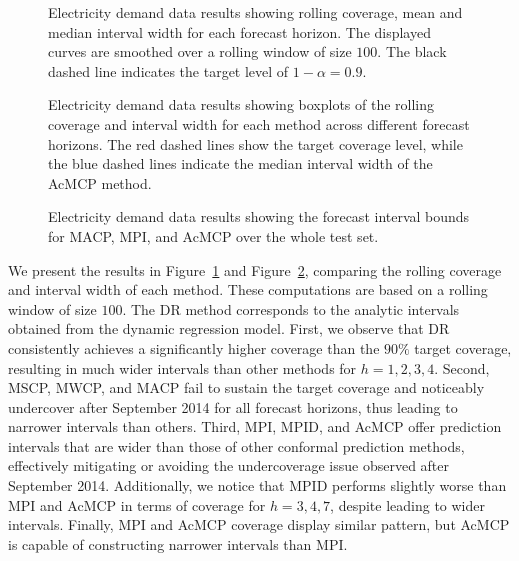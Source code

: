 \documentclass[
  11pt,
  12pt]{article}
\theoremstyle{plain}
\theoremstyle{remark}
\begin{document}
\begin{figure}


\caption{\label{fig-elec_cov}Electricity demand data results showing
rolling coverage, mean and median interval width for each forecast
horizon. The displayed curves are smoothed over a rolling window of size
\(100\). The black dashed line indicates the target level of
\(1-\alpha=0.9\).}

\end{figure}%

\begin{figure}


\caption{\label{fig-elec_box}Electricity demand data results showing
boxplots of the rolling coverage and interval width for each method
across different forecast horizons. The red dashed lines show the target
coverage level, while the blue dashed lines indicate the median interval
width of the AcMCP method.}

\end{figure}%

\begin{figure}


\caption{\label{fig-elec_timeplot}Electricity demand data results
showing the forecast interval bounds for MACP, MPI, and AcMCP over the
whole test set.}

\end{figure}%

We present the results in Figure~\ref{fig-elec_cov} and
Figure~\ref{fig-elec_box}, comparing the rolling coverage and interval
width of each method. These computations are based on a rolling window
of size \(100\). The DR method corresponds to the analytic intervals
obtained from the dynamic regression model. First, we observe that DR
consistently achieves a significantly higher coverage than the \(90\%\)
target coverage, resulting in much wider intervals than other methods
for \(h=1,2,3,4\). Second, MSCP, MWCP, and MACP fail to sustain the
target coverage and noticeably undercover after September 2014 for all
forecast horizons, thus leading to narrower intervals than others.
Third, MPI, MPID, and AcMCP offer prediction intervals that are wider
than those of other conformal prediction methods, effectively mitigating
or avoiding the undercoverage issue observed after September 2014.
Additionally, we notice that MPID performs slightly worse than MPI and
AcMCP in terms of coverage for \(h=3,4,7\), despite leading to wider
intervals. Finally, MPI and AcMCP coverage display similar pattern, but
AcMCP is capable of constructing narrower intervals than MPI.
\end{document}
